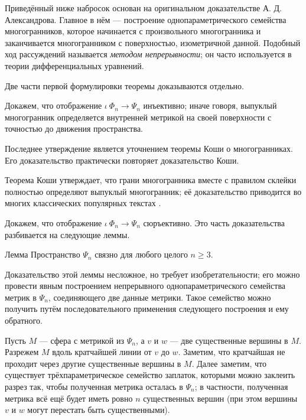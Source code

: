 \documentclass[oneside,a4paper]{article}
\begin{document}
Приведённый ниже набросок основан на оригинальном доказательстве А. Д. Александрова.
Главное в нём --- построение однопараметрического семейства многогранников, которое начинается с произвольного многогранника и заканчивается многогранником с поверхностью, изометричной данной.  
Подобный ход рассуждений называется \emph{методом непрерывности};
он часто используется в теории дифференциальных уравнений.

\medskip

Две части первой формулировки теоремы доказываются отдельно.

 Докажем, что отображение $\iota\:\Phi_n\to\Psi_n$ инъективно; иначе говоря, выпуклый многогранник определяется внутренней метрикой на своей поверхности с точностью до движения пространства.

Последнее утверждение является уточнением теоремы Коши о многогранниках. 
Его доказательство практически повторяет доказательство Коши.

Теорема Коши утверждает, что грани многогранника вместе с правилом склейки полностью определяют выпуклый многогранник;
её доказательство приводится во многих классических популярных текстах \cite{aigner-zigler,dolbilin,tabacnikov-fuks}.

\medskip

 Докажем, что отображение $\iota\:\Phi_n\to\Psi_n$ сюръективно.
Это часть доказательства разбивается на следующие леммы.

\begin{thm}{Лемма}
Пространство $\Psi_n$ связно для любого целого $n\ge 3$.
\end{thm}

Доказательство этой леммы несложное, но требует изобретательности; 
его можно провести явным построением непрерывного однопараметрического семейства  метрик в $\Psi_n$, соединяющего две данные метрики.
Такое семейство можно получить путём последовательного применения следующего построения и ему обратного.

Пусть $M$ --- сфера с метрикой из $\Psi_n$, а $v$ и $w$ --- две существенные вершины в $M$.
Разрежем $M$ вдоль кратчайшей линии от $v$ до $w$. 
Заметим, что кратчайшая не проходит через другие существенные вершины в $M$.
Далее заметим, что существует трёхпараметрическое семейство заплаток, которыми можно заклеить разрез так, чтобы полученная метрика осталась в $\Psi_n$; 
в частности, полученная метрика всё ещё будет иметь ровно $n$ существенных вершин (при этом вершины $v$ и $w$ могут перестать быть существенными).
\end{document}

